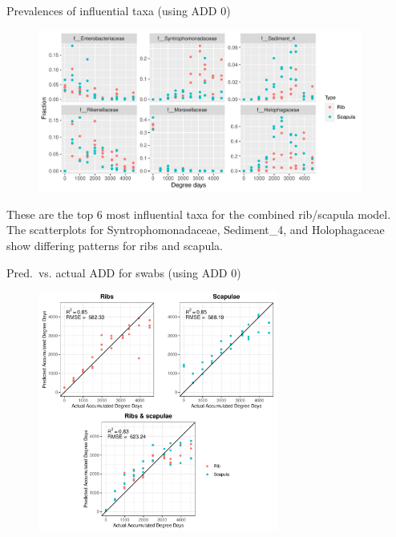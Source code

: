 \documentclass{beamer}
\begin{document}
\begin{frame}{Prevalences of influential taxa (using ADD 0)}

  \begin{center}
    \begin{figure}
      \includegraphics[height=2.1in]
        {w_swabs/bacteria/use_families/both_ribs_scapulae/w_baseline/infl_combined_swab_w_baseline_family_scatter}
    \end{figure}
  \end{center}

  \vspace{0.15in}

  \footnotesize{ \noindent These are the top 6 most influential taxa for the
    combined rib/scapula model.  The scatterplots for Syntrophomonadaceae,
    Sediment\_4, and Holophagaceae show differing patterns for ribs and
    scapula.
    }

\end{frame}



\begin{frame}{Pred.\ vs. actual ADD for swabs (using ADD 0)}

  \begin{center}
    \begin{figure}
      \includegraphics[height=3.1in]
        {w_swabs/bacteria/use_families/hl_combined_family_w_baseline_predicted_vs_actual_ADD}
    \end{figure}
  \end{center}
    
\end{frame}
\end{document}
